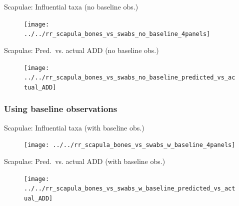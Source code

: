 \documentclass{beamer}
\begin{document}
\begin{frame}{Scapulae: Influential taxa (no baseline obs.)}

  \begin{center}
    \begin{figure}
      \texttt{[image: ../../rr\_scapula\_bones\_vs\_swabs\_no\_baseline\_4panels]}
    \end{figure}
  \end{center}

\end{frame}


\begin{frame}{Scapulae: Pred.\ vs. actual ADD (no baseline obs.)}

  \begin{center}
    \begin{figure}
      \texttt{[image: ../../rr\_scapula\_bones\_vs\_swabs\_no\_baseline\_predicted\_vs\_actual\_ADD]}
    \end{figure}
  \end{center}

\end{frame}


\subsubsection[With baseline]{Using baseline observations}

\begin{frame}{Scapulae: Influential taxa (with baseline obs.)}

  \begin{center}
    \begin{figure}
      \texttt{[image: ../../rr\_scapula\_bones\_vs\_swabs\_w\_baseline\_4panels]}
    \end{figure}
  \end{center}

\end{frame}


\begin{frame}{Scapulae: Pred.\ vs. actual ADD (with baseline obs.)}

  \begin{center}
    \begin{figure}
      \texttt{[image: ../../rr\_scapula\_bones\_vs\_swabs\_w\_baseline\_predicted\_vs\_actual\_ADD]}
    \end{figure}
  \end{center}

\end{frame}



\end{document}
